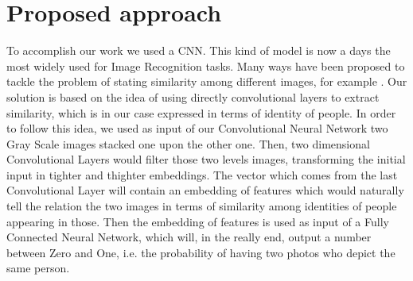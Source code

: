 \section{Proposed approach}
%

To accomplish our work we used a CNN. This kind of model is now a days the most widely used for Image Recognition tasks. Many ways have been proposed to tackle the problem of stating similarity among different images, for example . Our solution is based on the idea of using directly convolutional layers to extract similarity, which is in our case expressed in terms of identity of people. In order to follow this idea, we used as input of our Convolutional Neural Network two Gray Scale images stacked one upon the other one. Then, two dimensional Convolutional Layers would filter those two levels images, transforming the initial input in tighter and thighter embeddings. The vector which comes from the last Convolutional Layer will contain an embedding of features which would naturally tell the relation the two images in terms of similarity among identities of people appearing in those. Then the embedding of features is used as input of a Fully Connected Neural Network, which will, in the really end, output a number between Zero and One, i.e. the probability of having two photos who depict the same person.

